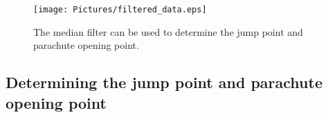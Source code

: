 \begin{figure}
  \centering
  \texttt{[image: Pictures/filtered\_data.eps]}
  \caption{The median filter can be used to determine the jump point and parachute opening point.}
  \label{fig:filtered_data}
\end{figure}

\subsection{Determining the jump point and parachute opening point}